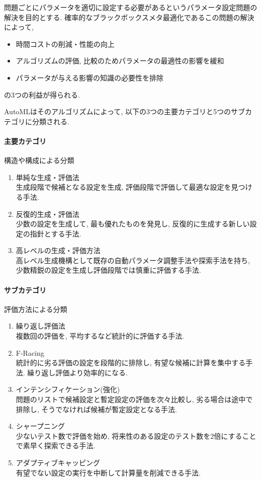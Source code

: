 \documentclass[twocolumn]{jarticle}     %
\begin{document}
問題ごとにパラメータを適切に設定する必要があるというパラメータ設定問題の解決を目的とする.
確率的なブラックボックスメタ最適化であるこの問題の解決によって,
\begin{itemize}
  \item 時間コストの削減・性能の向上
  \item アルゴリズムの評価, 比較のためパラメータの最適性の影響を緩和
  \item パラメータが与える影響の知識の必要性を排除
\end{itemize}
の3つの利益が得られる.

AutoMLはそのアルゴリズムによって, 以下の3つの主要カテゴリと5つのサブカテゴリに分類される\cite{SurveyAutoML}.

\paragraph{主要カテゴリ}
構造や構成による分類
\begin{enumerate}
  \item 単純な生成・評価法 \\
  生成段階で候補となる設定を生成, 評価段階で評価して最適な設定を見つける手法.

  \item 反復的生成・評価法 \\
  少数の設定を生成して, 最も優れたものを発見し, 反復的に生成する新しい設定の指針とする手法.

  \item 高レベルの生成・評価方法 \\
  高レベル生成機構として既存の自動パラメータ調整手法や探索手法を持ち,
  少数精鋭の設定を生成し評価段階では慎重に評価する手法.
\end{enumerate}

\paragraph{サブカテゴリ}
評価方法による分類
\begin{enumerate}
  \item 繰り返し評価法 \\
  複数回の評価を, 平均するなど統計的に評価する手法.

  \item F-Racing \\
  統計的に劣る評価の設定を段階的に排除し, 有望な候補に計算を集中する手法. 繰り返し評価より効率的になる.

  \item インテンシフィケーション(強化) \\
  問題のリストで候補設定と暫定設定の評価を次々比較し, 劣る場合は途中で排除し, そうでなければ候補が暫定設定となる手法.

  \item シャープニング \\
  少ないテスト数で評価を始め, 将来性のある設定のテスト数を2倍にすることで素早く探索できる手法.

  \item アダプティブキャッピング  \\
  有望でない設定の実行を中断して計算量を削減できる手法.
\end{enumerate}
\end{document}
